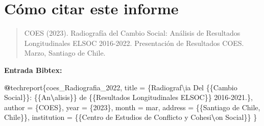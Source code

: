 \documentclass[
  12pt,
]{book}
\newenvironment{Shaded}{\begin{snugshade}}{\end{snugshade}}
\newcommand{\NormalTok}[1]{#1}
\newcommand{\OtherTok}[1]{\textcolor[rgb]{0.56,0.35,0.01}{#1}}
\newcommand{\SpecialCharTok}[1]{\textcolor[rgb]{0.81,0.36,0.00}{\textbf{#1}}}
\newcommand{\StringTok}[1]{\textcolor[rgb]{0.31,0.60,0.02}{#1}}
\begin{document}
\hypertarget{cuxf3mo-citar-este-informe}{%
\chapter*{Cómo citar este informe}\label{cuxf3mo-citar-este-informe}}

\begin{quote}
COES (2023). Radiografía del Cambio Social: Análisis de Resultados Longitudinales ELSOC 2016-2022. Presentación de Resultados COES. Marzo, Santiago de Chile.
\end{quote}

\textbf{Entrada Bibtex:}

\begin{Shaded}
\begin{Highlighting}[]
\SpecialCharTok{@}\NormalTok{techreport\{coes\_Radiografia\_2022,}
\NormalTok{  title }\OtherTok{=}\NormalTok{ \{Radiograf\textbackslash{}}\StringTok{\textquotesingle{}ia Del \{\{Cambio Social\}\}: \{\{An}\SpecialCharTok{\textbackslash{}\textquotesingle{}}\StringTok{alisis\}\} de \{\{Resultados Longitudinales ELSOC\}\} 2016{-}2021.\},}
\StringTok{  author = \{COES\},}
\StringTok{  year = \{2023\},}
\StringTok{  month = mar,}
\StringTok{  address = \{\{Santiago de Chile, Chile\}\},}
\StringTok{  institution = \{\{Centro de Estudios de Conflicto y Cohesi}\SpecialCharTok{\textbackslash{}\textquotesingle{}}\StringTok{on Social\}\}}
\StringTok{\}}
\end{Highlighting}
\end{Shaded}
\end{document}
